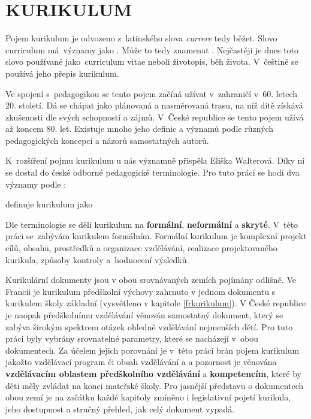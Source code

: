 \chapter{KURIKULUM}
\label{kurikulum}
Pojem kurikulum je odvozeno z latinského slova \textit{currere} tedy běžet.  Slovo curriculum má významy jako \textit{}. Může to tedy znamenat \textit{}.\citep[s.~24]{Opravilova} Nejčastěji je dnes toto slovo používané jako curriculum vitae neboli životopis, běh života. V češtině se používá jeho přepis kurikulum.

Ve spojení s pedagogikou se tento pojem začíná užívat v zahraničí v 60. letech 20. století. Dá se chápat jako plánovaná a nasměrovaná trasu, na níž dítě získává zkušenosti dle svých schopností a zájmů. V České republice se tento pojem užívá až koncem 80. let. Existuje mnoho jeho definic a významů podle různých pedagogických koncepcí a názorů samostatných autorů.

K rozšíření pojmu kurikulum u nás významně přispěla Eliška Walterová. Díky ní se dostal do české odborné pedagogické terminologie. Pro tuto práci se hodí dva významy podle \citet[s.~15]{Walterova}:



\citet{Prucha} definuje kurikulum jako 

Dle terminologie se dělí kurikulum na \textbf{formální}, \textbf{neformální} a \textbf{skryté}. V této práci se zabývám kurikulem formálním. Formální kurikulum je komplexní projekt cílů, obsahu, prostředků a organizace vzdělávání, realizace projektovaného kurikula, způsoby kontroly a hodnocení výsledků.

Kurikulární dokumenty jsou v obou srovnávaných zemích pojímány odlišně. Ve Francii je kurikulum předškolní výchovy zahrnuto v jednom dokumentu s kurikulem školy základní (vysvětleno v kapitole \ref{frkurikulum}). V České republice je naopak předškolnímu vzdělávání věnován samostatný dokument, který se zabýva širokým spektrem otázek ohledně vzdělávání nejmenších dětí. Pro tuto práci byly vybrány srovnatelné parametry, které se nacházejí v obou dokumentech. Za účelem jejich porovnání je v této práci brán pojem kurikulum jakožto vzdělávací program či obsah vzdělávání a a pozornost je věnována \textbf{vzdělávacím oblastem předškolního vzdělávání} a \textbf{kompetencím}, které by děti měly zvládat na konci mateřské školy. Pro jasnější představu o dokumentech obou zemí je na začátku každé kapitoly zmíněno i legislativní pojetí kurikula, jeho dostupnost a stručný přehled, jak celý dokument vypadá. 

